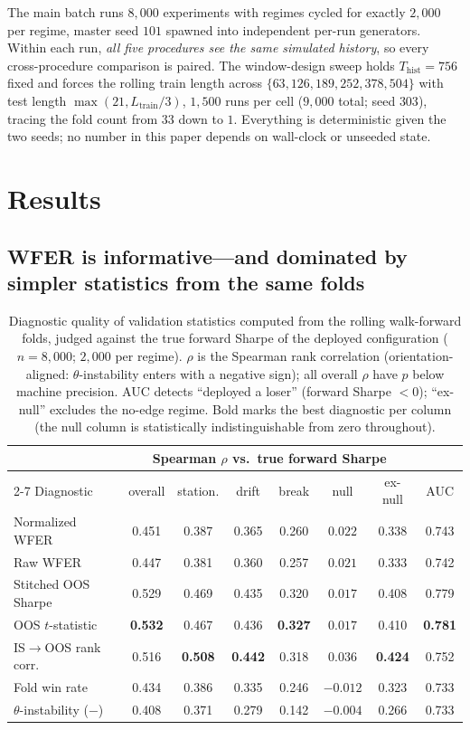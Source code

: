 \documentclass[11pt]{article}
\begin{document}
The main batch runs $8{,}000$ experiments with regimes cycled for exactly
$2{,}000$ per regime, master seed $101$ spawned into independent per-run
generators. Within each run, \emph{all five procedures see the same simulated
history}, so every cross-procedure comparison is paired. The window-design
sweep holds $T_{\mathrm{hist}} = 756$ fixed and forces the rolling train
length across $\{63, 126, 189, 252, 378, 504\}$ with test length
$\max(21, L_{\mathrm{train}}/3)$, $1{,}500$ runs per cell ($9{,}000$ total;
seed $303$), tracing the fold count from $33$ down to $1$. Everything is
deterministic given the two seeds; no number in this paper depends on
wall-clock or unseeded state.

\section{Results}

\subsection{WFER is informative---and dominated by simpler statistics from
the same folds}
\label{sec:informative}

\begin{table}[t]
\centering
\caption{Diagnostic quality of validation statistics computed from the
rolling walk-forward folds, judged against the true forward Sharpe of the
deployed configuration ($n=8{,}000$; $2{,}000$ per regime). $\rho$ is the
Spearman rank correlation (orientation-aligned: $\theta$-instability enters
with a negative sign); all overall $\rho$ have $p$ below machine precision.
AUC detects ``deployed a loser'' (forward Sharpe $<0$); ``ex-null'' excludes
the no-edge regime. Bold marks the best diagnostic per column (the null
column is statistically indistinguishable from zero throughout).}
\label{tab:diag}
\small
\begin{tabular}{lcccccc@{\hskip 1.6em}c}
\toprule
& \multicolumn{6}{c}{Spearman $\rho$ vs.\ true forward Sharpe} & \\
\cmidrule(lr){2-7}
Diagnostic & overall & station. & drift & break & null & ex-null & AUC \\
\midrule
Normalized WFER       & 0.451 & 0.387 & 0.365 & 0.260 & $0.022$ & 0.338 & 0.743 \\
Raw WFER              & 0.447 & 0.381 & 0.360 & 0.257 & $0.021$ & 0.333 & 0.742 \\
Stitched OOS Sharpe   & 0.529 & 0.469 & 0.435 & 0.320 & $0.017$ & 0.408 & 0.779 \\
OOS $t$-statistic     & \textbf{0.532} & 0.467 & 0.436 & \textbf{0.327} & $0.017$ & 0.410 & \textbf{0.781} \\
IS$\to$OOS rank corr. & 0.516 & \textbf{0.508} & \textbf{0.442} & 0.318 & $0.036$ & \textbf{0.424} & 0.752 \\
Fold win rate         & 0.434 & 0.386 & 0.335 & 0.246 & $-0.012$ & 0.323 & 0.733 \\
$\theta$-instability ($-$) & 0.408 & 0.371 & 0.279 & 0.142 & $-0.004$ & 0.266 & 0.733 \\
\bottomrule
\end{tabular}
\end{table}
\end{document}
